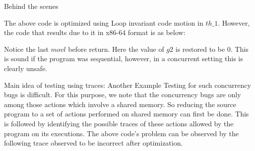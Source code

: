 \documentclass[notes, xcolor=dvipsnames]{beamer}
\begin{document}

    \begin{frame}{Behind the scenes}

        The above code is optimized using Loop invariant code motion in $th\_1$.
        However, the code that results due to it in x86-64 format is as below:
        \begin{figure}
        \end{figure}

        Notice the last $movl$ before return. 
        Here the value of $g2$ is restored to be $0$.
        This is sound if the program was sequential, however, in a concurrent setting this is clearly unsafe.
        
    \end{frame}


    \begin{frame}{Main idea of testing using traces: Another Example}
        Testing for such concurrency bugs is difficult. 
        For this purpose, we note that the concurrency bugs are only among those actions which involve a shared memory.
        So reducing the source program to a set of actions performed on shared memory can first be done. 
        This is followed by identifying the possible traces of these actions allowed by the program on its executions.
        The above code's problem can be observed by the following trace observed to be incorrect after optimization.
        \begin{figure}
        \end{figure} 

    \end{frame}
\end{document}
